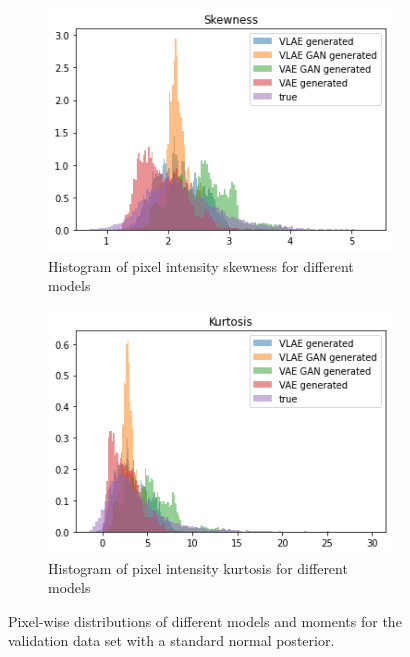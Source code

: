 \begin{figure}
    \hfill
    \begin{subfigure}{0.4\textwidth}
        \centering
        \includegraphics[width=\textwidth]{images/generated_vs_true/mnist_vs_models_skew_gauss_post.png}
        \caption{Histogram of pixel intensity skewness for different models}
        \label{subfig:skew_generated_vs_true_gauss_post}
    \end{subfigure}
    \hfill
    \begin{subfigure}{0.4\textwidth}
        \centering
        \includegraphics[width=\textwidth]{images/generated_vs_true/mnist_vs_models_kurt_gauss_post.png}
        \caption{Histogram of pixel intensity kurtosis for different models}
        \label{subfig:kurt_generated_vs_true_gauss_post}
    \end{subfigure}
    \caption[Models on \textsc{Mnist}: Pixel-wise distributions - Gaussian Posterior]{Pixel-wise distributions of different models and moments for the validation data set with a standard normal posterior.}
    \label{fig:mean_generated_vs_true_gauss_post}
\end{figure}

